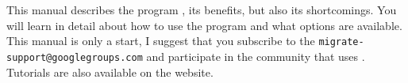 This manual describes the program \migrate, its benefits, but also its shortcomings. You will learn in detail about how to use the program and what options are available. This manual is only a start, I suggest that you subscribe to the {\tt migrate-support@googlegroups.com} and participate in the community that uses \migrate. Tutorials are also available on the \migrate website.